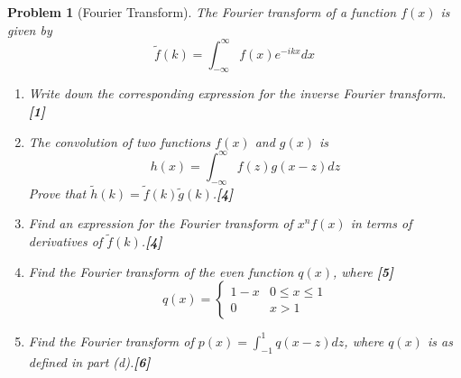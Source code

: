 \documentclass[a4paper]{article}
\theoremstyle{new}
\newtheorem{qns}{Problem}[section]
\begin{document}
\begin{qns}[Fourier Transform]
The Fourier transform of a function $f(x)$ is given by
$$\tilde{f}(k)=\int_{-\infty}^\infty f(x)e^{-ikx}dx$$
\begin{enumerate}[label=(\alph*)]
\item Write down the corresponding expression for the inverse Fourier transform.\hfill\textbf{[1]}
\item The convolution of two functions $f(x)$ and $g(x)$ is
$$h(x)=\int_{-\infty}^\infty f(z)g(x-z)dz$$
Prove that $\tilde{h}(k) = \tilde{f}(k)\tilde{g}(k)$.\hfill\textbf{[4]}
\item Find an expression for the Fourier transform of $x^nf(x)$ in terms of derivatives of $\tilde{f}(k)$.\hfill\textbf{[4]}
\item Find the Fourier transform of the even function $q(x)$, where \hfill\textbf{[5]}
$$q(x)=
\left\{
        \begin{array}{ll}
      1-x & 0\leq x\leq 1 \\
      0 & x>1
        \end{array}
    \right.$$
\item Find the Fourier transform of $p(x)=\int_{-1}^1q(x-z)dz$, where $q(x)$ is as defined in part (d).\hfill\textbf{[6]}
\end{enumerate}
\end{qns}
\end{document}
